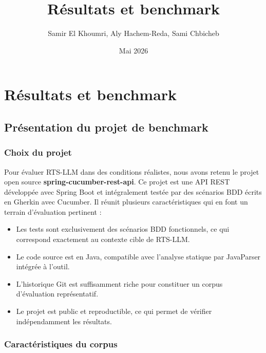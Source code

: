 \documentclass[12pt,a4paper]{article}
\title{\textbf{Résultats et benchmark}}
\author{Samir El Khoumri, Aly Hachem-Reda, Sami Chbicheb}
\date{Mai 2026}
\begin{document}
\maketitle
\tableofcontents
\newpage

\section{Résultats et benchmark}

\subsection{Présentation du projet de benchmark}

\subsubsection{Choix du projet}

Pour évaluer RTS-LLM dans des conditions réalistes, nous avons retenu le
projet open source \textbf{spring-cucumber-rest-api}. Ce projet est une
API REST développée avec Spring Boot et intégralement testée par des
scénarios BDD écrits en Gherkin avec Cucumber. Il réunit plusieurs
caractéristiques qui en font un terrain d'évaluation pertinent :

\begin{itemize}[noitemsep]
  \item Les tests sont exclusivement des scénarios BDD fonctionnels,
        ce qui correspond exactement au contexte cible de RTS-LLM.
  \item Le code source est en Java, compatible avec l'analyse statique
        par JavaParser intégrée à l'outil.
  \item L'historique Git est suffisamment riche pour constituer un corpus
        d'évaluation représentatif.
  \item Le projet est public et reproductible, ce qui permet de vérifier
        indépendamment les résultats.
\end{itemize}

\subsubsection{Caractéristiques du corpus}
\end{document}
